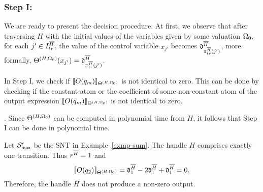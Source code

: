 \subsubsection{Step I:} 
We are ready to present the decision procedure. At first, we observe that  after traversing $H$ with the initial values of the variables given by some valuation $\Omega_0$, for each $j' \in I^{\overline{H}}_{tr}$, the value of the control variable $x_{j'}$ becomes $\mathfrak{d}^{\overline{H}}_{\pi^{\overline{H}}_{tr}(j')}$,  more formally, $\Theta^{(H,\Omega_0)}(x_{j'})=\mathfrak{d}^{\overline{H}}_{\pi^{\overline{H}}_{tr}(j')}$.

In Step I, we check if $\llbracket O(q_m)\rrbracket_{\Theta^{(H,\Omega_0)}}$ is not identical to zero.
This can be done by checking if the constant-atom or the coefficient of some non-constant atom of the output expression $\llbracket O(q_m)\rrbracket_{\Theta^{(H,\Omega_0)}}$ is not identical to zero.
%
\bigskip\\
\medskip

. Since $\Theta^{(H,\Omega_0)}$ can be computed in polynomial time from $H$, it follows that Step I can be done in polynomial time.


\begin{example}\label{exmp-step-1}
Let ${\mathcal{S} }'_{\sf max}$ be the SNT in Example~\ref{exmp-sum}. The handle $H$ comprises exactly one transition. Thus $r^{\overline{H}}=1$ and 
\[\llbracket O(q_2)\rrbracket_{\Theta^{(H, \Omega_0)}} = \mathfrak{d}^{\overline{H}}_1 - 2 \mathfrak{d}^{\overline{H}}_1 + \mathfrak{d}^{\overline{H}}_1=0.\]
Therefore, the handle $H$ does not produce a non-zero output.
\end{example}

